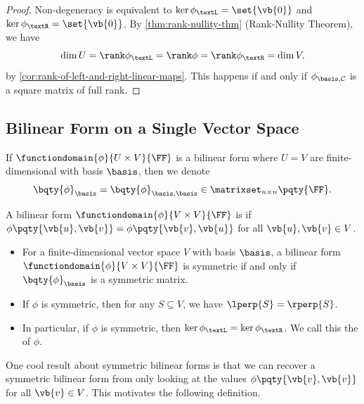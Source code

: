 \begin{proof}
    Non-degeneracy is equivalent to \(\ker \phi_{\textL} = \set{\vb{0}}\) and \(\ker \phi_{\textR} = \set{\vb{0}}\). By \autoref{thm:rank-nullity-thm} (Rank-Nullity Theorem), we have
    \[
        \dim U = \rank \phi_{\textL} = \rank \phi = \rank \phi_{\textR} = \dim V,
    \]
    by \autoref{cor:rank-of-left-and-right-linear-maps}. This happens if and only if \(\phi_{\basis, \mathcal{C}}\) is a square matrix of full rank.
\end{proof}

\subsection{Bilinear Form on a Single Vector Space}

If \(\functiondomain{\phi}{U \times V}{\FF}\) is a bilinear form where \(U = V\) are finite-dimensional with basis \(\basis\), then we denote
\[
    \bqty{\phi}_{\basis} = \bqty{\phi}_{\basis, \basis} \in \matrixset_{n \times n} \pqty{\FF}.
\]

\begin{definition}
    A bilinear form \(\functiondomain{\phi}{V \times V}{\FF}\) is  if \(\phi\pqty{\vb{u}, \vb{v}} = \phi\pqty{\vb{v}, \vb{u}}\) for all \(\vb{u}, \vb{v} \in V\).
\end{definition}

\begin{remarks}
    \begin{itemize}
        \item For a finite-dimensional vector space \(V\) with basis \(\basis\), a bilinear form \(\functiondomain{\phi}{V \times V}{\FF}\) is symmetric if and only if \(\bqty{\phi}_{\basis}\) is a symmetric matrix.
        \item If \(\phi\) is symmetric, then for any \(S \subseteq V\), we have \(\lperp{S} = \rperp{S}\).
        \item In particular, if \(\phi\) is symmetric, then \(\ker \phi_{\textL} = \ker \phi_{\textR}\). We call this the  of \(\phi\).
    \end{itemize}
\end{remarks}

One cool result about symmetric bilinear forms is that we can recover a symmetric bilinear form from only looking at the values \(\phi\pqty{\vb{v}, \vb{v}}\) for all \(\vb{v} \in V\). This motivates the following definition.

